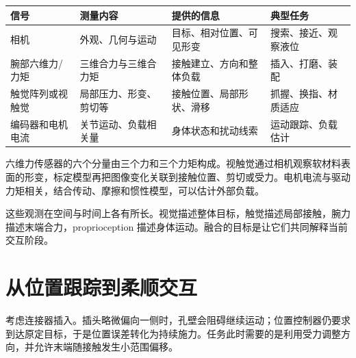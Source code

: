 \documentclass[UTF8,a4paper,11pt,oneside,openany,fontset=none]{ctexbook}
\begin{document}
{\small %
\begin{longtable}[]{@{}
  >{\raggedright\arraybackslash}p{}
  >{\raggedright\arraybackslash}p{}
  >{\raggedright\arraybackslash}p{}
  >{\raggedright\arraybackslash}p{}@{}}
\toprule\noalign{}
\begin{minipage}[b]{\linewidth}\raggedright
信号
\end{minipage} & \begin{minipage}[b]{\linewidth}\raggedright
测量内容
\end{minipage} & \begin{minipage}[b]{\linewidth}\raggedright
提供的信息
\end{minipage} & \begin{minipage}[b]{\linewidth}\raggedright
典型任务
\end{minipage} \\
\midrule\noalign{}
\endhead
\bottomrule\noalign{}
\endlastfoot
相机 & 外观、几何与运动 & 目标、相对位置、可见形变 & 搜索、接近、观察液位 \\
腕部六维力/力矩 & 三维合力与三维合力矩 & 接触建立、方向和整体负载 & 插入、打磨、装配 \\
触觉阵列或视触觉 & 局部压力、形变、剪切等 & 接触位置、局部形状、滑移 & 抓握、换指、材质适应 \\
编码器和电机电流 & 关节运动、负载相关量 & 身体状态和扰动线索 & 运动跟踪、负载估计 \\
\end{longtable}
}

六维力传感器的六个分量由三个力和三个力矩构成。视触觉通过相机观察软材料表面的形变，标定模型再把图像变化关联到接触位置、剪切或受力。电机电流与驱动力矩相关，结合传动、摩擦和惯性模型，可以估计外部负载。

这些观测在空间与时间上各有所长。视觉描述整体目标，触觉描述局部接触，腕力描述末端合力，proprioception 描述身体运动。融合的目标是让它们共同解释当前交互阶段。

\section{从位置跟踪到柔顺交互}

考虑连接器插入。插头略微偏向一侧时，孔壁会阻碍继续运动；位置控制器仍要求到达原定目标，于是位置误差转化为持续施力。任务此时需要的是利用受力调整方向，并允许末端随接触发生小范围偏移。
\end{document}
